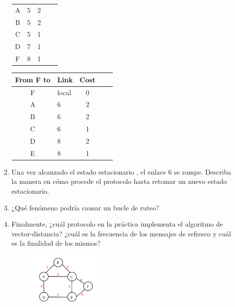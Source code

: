 \begin{enumerate}
\begin{enumerate}
\begin{table}[H]
\begin{tabular}{@{}clcll@{}}
                A                    & 5                        & 2                    \\
                B                    & 5                        & 2                    \\
                C                    & 5                        & 1                    \\ 
                D                    & 7                        & 1                    \\ 
                F                    & 8                        & 1                    \\ \bottomrule
            \end{tabular}
            \hfill
            \begin{tabular}{@{}clcll@{}}
                \toprule
                From F to            & \multicolumn{1}{c}{Link} & Cost                 \\ \midrule
                F                    & local                    & 0                    \\ 
                A                    & 6                        & 2                    \\
                B                    & 6                        & 2                    \\ 
                C                    & 6                        & 1                    \\
                D                    & 8                        & 2                    \\
                E                    & 8                        & 1                    \\ \bottomrule
            \end{tabular}
        \end{table}

        \item Una vez alcanzado el estado estacionario , el enlace 6 se rompe. Describa la manera en c\'omo procede el protocolo
        hasta retomar un nuevo estado estacionario.
        \item ¿Qu\'e fen\'omeno podr\'ia causar un bucle de ruteo?
        \item Finalmente, ¿cu\'al protocolo en la pr\'actica implementa el algoritmo de vector-distancia? ¿cu\'al es la frecuencia
        de los mensajes de refresco y cu\'al es la finalidad de los mismos?

        \begin{figure}[H]
            \centering
            \includegraphics[width=0.35\textwidth]{img/Vector-distancia.png}
        \end{figure}
    \end{enumerate}


\end{enumerate}
